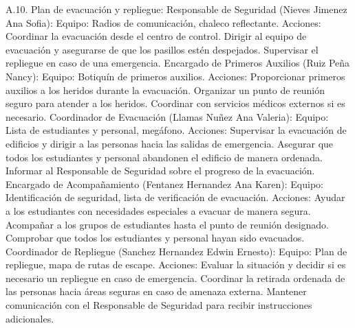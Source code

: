     A.10. Plan de evacuación y repliegue:
    Responsable de Seguridad (Nieves Jimenez Ana Sofia):
    Equipo: Radios de comunicación, chaleco reflectante.
    Acciones:
    Coordinar la evacuación desde el centro de control.
    Dirigir al equipo de evacuación y asegurarse de que los pasillos estén despejados.
    Supervisar el repliegue en caso de una emergencia.
    Encargado de Primeros Auxilios (Ruiz Peña Nancy):
    Equipo: Botiquín de primeros auxilios.
    Acciones:
    Proporcionar primeros auxilios a los heridos durante la evacuación.
    Organizar un punto de reunión seguro para atender a los heridos.
    Coordinar con servicios médicos externos si es necesario.
    Coordinador de Evacuación (Llamas Nuñez Ana Valeria):
    Equipo: Lista de estudiantes y personal, megáfono.
    Acciones:
    Supervisar la evacuación de edificios y dirigir a las personas hacia las salidas de emergencia.
    Asegurar que todos los estudiantes y personal abandonen el edificio de manera ordenada.
    Informar al Responsable de Seguridad sobre el progreso de la evacuación.
    Encargado de Acompañamiento (Fentanez Hernandez Ana Karen):
    Equipo: Identificación de seguridad, lista de verificación de evacuación.
    Acciones:
    Ayudar a los estudiantes con necesidades especiales a evacuar de manera segura.
    Acompañar a los grupos de estudiantes hasta el punto de reunión designado.
    Comprobar que todos los estudiantes y personal hayan sido evacuados.
    Coordinador de Repliegue (Sanchez Hernandez Edwin Ernesto):
    Equipo: Plan de repliegue, mapa de rutas de escape.
    Acciones:
    Evaluar la situación y decidir si es necesario un repliegue en caso de emergencia.
    Coordinar la retirada ordenada de las personas hacia áreas seguras en caso de amenaza externa.
    Mantener comunicación con el Responsable de Seguridad para recibir instrucciones adicionales.
    
